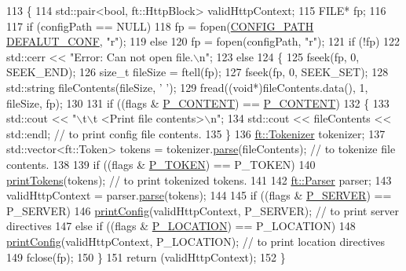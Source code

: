 \begin{DoxyCode}
113     \{
114         std::pair<bool, ft::HttpBlock>  validHttpContext;
115         FILE* fp;
116 
117         \textcolor{keywordflow}{if} (configPath == NULL)
118             fp = fopen(\hyperlink{_print_config_8hpp_a863ab5d791c86f9dfff4c6e90624130c}{CONFIG\_PATH} \hyperlink{_print_config_8hpp_ad14ba04d63754e647bc8c8f61b128c82}{DEFALUT\_CONF}, \textcolor{stringliteral}{"r"});
119         \textcolor{keywordflow}{else}
120             fp = fopen(configPath, \textcolor{stringliteral}{"r"});
121         \textcolor{keywordflow}{if} (!fp)
122             std::cerr << \textcolor{stringliteral}{"Error: Can not open file.\(\backslash\)n"};
123         \textcolor{keywordflow}{else}
124         \{
125             fseek(fp, 0, SEEK\_END);
126             \textcolor{keywordtype}{size\_t} fileSize = ftell(fp);
127             fseek(fp, 0, SEEK\_SET);
128             std::string fileContents(fileSize, \textcolor{charliteral}{' '});
129             fread((\textcolor{keywordtype}{void}*)fileContents.data(), 1, fileSize, fp);
130 
131             \textcolor{keywordflow}{if} ((flags & \hyperlink{_print_config_8hpp_afced66284d6faa573d4b84eb6467145a}{P\_CONTENT}) == \hyperlink{_print_config_8hpp_afced66284d6faa573d4b84eb6467145a}{P\_CONTENT})
132             \{
133                 std::cout << \textcolor{stringliteral}{"\(\backslash\)t\(\backslash\)t <Print file contents>\(\backslash\)n"};
134                 std::cout << fileContents << std::endl; \textcolor{comment}{// to print config file contents.}
135             \}
136             \hyperlink{classft_1_1_tokenizer}{ft::Tokenizer} tokenizer;
137             std::vector<ft::Token> tokens = tokenizer.\hyperlink{classft_1_1_tokenizer_a10bacfc70f3d74a0e04218c1df86f6c2}{parse}(fileContents); \textcolor{comment}{// to tokenize file
       contents.}
138 
139             \textcolor{keywordflow}{if} ((flags & \hyperlink{_print_config_8hpp_a03a033ee33dd7c0a62af29e9c5a6b9f4}{P\_TOKEN}) == P\_TOKEN)
140                 \hyperlink{classft_1_1_print_config_aecc55315a253587bb0a987bd086ca39b}{printTokens}(tokens); \textcolor{comment}{// to print tokenized tokens.}
141 
142             \hyperlink{classft_1_1_parser}{ft::Parser}    parser;
143             validHttpContext = parser.\hyperlink{classft_1_1_parser_ace9c91f641d6eb5467ce89798679b248}{parse}(tokens);
144 
145             \textcolor{keywordflow}{if} ((flags & \hyperlink{_print_config_8hpp_a6570b904c6ce4c61a76f61f0002b4b7b}{P\_SERVER}) == P\_SERVER)
146                 \hyperlink{classft_1_1_print_config_a09fbf488251ed5f5079e798b1ce04caf}{printConfig}(validHttpContext, P\_SERVER); \textcolor{comment}{// to print server directives}
147             \textcolor{keywordflow}{else} \textcolor{keywordflow}{if} ((flags & \hyperlink{_print_config_8hpp_aa57280f65c1d8b88de25d67b2353a7dd}{P\_LOCATION}) == P\_LOCATION)
148                 \hyperlink{classft_1_1_print_config_a09fbf488251ed5f5079e798b1ce04caf}{printConfig}(validHttpContext, P\_LOCATION); \textcolor{comment}{// to print location directives}
149             fclose(fp);
150         \}
151         \textcolor{keywordflow}{return} (validHttpContext);
152     \}
\end{DoxyCode}
